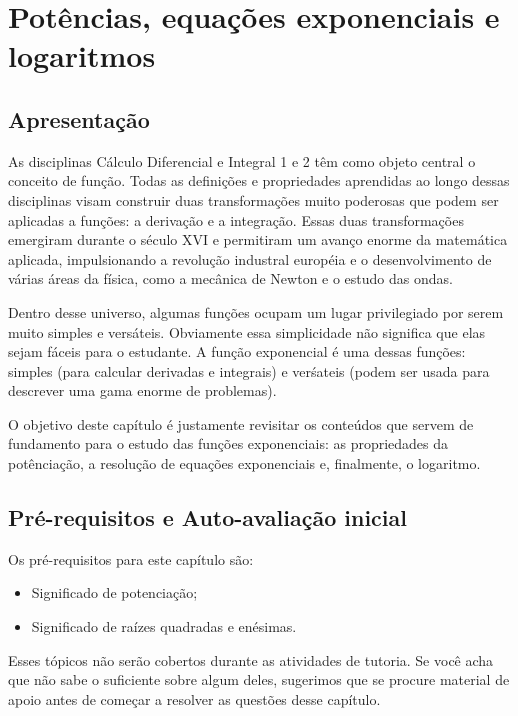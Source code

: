 \documentclass[main_estudante.tex]{subfiles}
\begin{document}
\chapter{Potências, equações exponenciais e logaritmos}

\section{Apresentação}

As disciplinas Cálculo Diferencial e Integral 1 e 2 têm como objeto central o conceito de função. Todas as definições e propriedades aprendidas ao longo dessas disciplinas visam construir duas transformações muito poderosas que podem ser aplicadas a funções: a derivação e a integração. Essas duas transformações emergiram durante o século XVI e permitiram um avanço enorme da matemática aplicada, impulsionando a revolução industral européia e o desenvolvimento de várias áreas da física, como a mecânica de Newton e o estudo das ondas.

Dentro desse universo, algumas funções ocupam um lugar privilegiado por serem muito simples e versáteis. Obviamente essa simplicidade não significa que elas sejam fáceis para o estudante. A função exponencial é uma dessas funções: simples (para calcular derivadas e integrais) e verśateis (podem ser usada para descrever uma gama enorme de problemas).

O objetivo deste capítulo é justamente revisitar os conteúdos que servem de fundamento para o estudo das funções exponenciais: as propriedades da potênciação, a resolução de equações exponenciais e, finalmente, o logaritmo.

\newpage

\section{Pré-requisitos e Auto-avaliação inicial}

Os pré-requisitos para este capítulo são:
\begin{itemize}
 \item Significado de potenciação;
 \item Significado de raízes quadradas e enésimas.
\end{itemize}

Esses tópicos não serão cobertos durante as atividades de tutoria. Se você acha que não sabe o suficiente sobre algum deles, sugerimos que se procure material de apoio antes de começar a resolver as questões desse capítulo.
\end{document}
